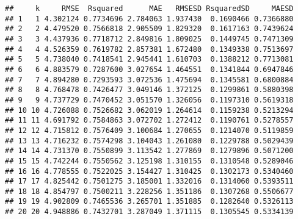 \documentclass[]{article}
\newenvironment{Shaded}{\begin{snugshade}}{\end{snugshade}}
\newcommand{\CommentTok}[1]{\textcolor[rgb]{0.56,0.35,0.01}{\textit{#1}}}
\newcommand{\DataTypeTok}[1]{\textcolor[rgb]{0.13,0.29,0.53}{#1}}
\newcommand{\DecValTok}[1]{\textcolor[rgb]{0.00,0.00,0.81}{#1}}
\newcommand{\KeywordTok}[1]{\textcolor[rgb]{0.13,0.29,0.53}{\textbf{#1}}}
\newcommand{\NormalTok}[1]{#1}
\newcommand{\OperatorTok}[1]{\textcolor[rgb]{0.81,0.36,0.00}{\textbf{#1}}}
\newcommand{\OtherTok}[1]{\textcolor[rgb]{0.56,0.35,0.01}{#1}}
\newcommand{\StringTok}[1]{\textcolor[rgb]{0.31,0.60,0.02}{#1}}
\begin{document}
\begin{Shaded}
\end{Shaded}

\begin{verbatim}
##     k     RMSE  Rsquared      MAE   RMSESD RsquaredSD     MAESD
## 1   1 4.302124 0.7734696 2.784063 1.937430  0.1690466 0.7366880
## 2   2 4.479520 0.7566818 2.905509 1.829320  0.1617163 0.7439624
## 3   3 4.437936 0.7718712 2.849816 1.809025  0.1449745 0.7471309
## 4   4 4.526359 0.7619782 2.857381 1.672480  0.1349338 0.7513697
## 5   5 4.738040 0.7418541 2.945441 1.610703  0.1388212 0.7713081
## 6   6 4.883579 0.7287600 3.027654 1.464551  0.1341844 0.6947846
## 7   7 4.894280 0.7293593 3.072536 1.475694  0.1345581 0.6800884
## 8   8 4.768478 0.7426477 3.049146 1.372125  0.1299861 0.5880398
## 9   9 4.737729 0.7470452 3.051570 1.326056  0.1197310 0.5619318
## 10 10 4.726088 0.7526682 3.062019 1.264614  0.1159238 0.5213294
## 11 11 4.691792 0.7584863 3.072702 1.272412  0.1190761 0.5278557
## 12 12 4.715812 0.7576409 3.100684 1.270655  0.1214070 0.5119859
## 13 13 4.716232 0.7574298 3.104043 1.261080  0.1229788 0.5029439
## 14 14 4.731370 0.7550899 3.113542 1.277869  0.1279896 0.5071200
## 15 15 4.742244 0.7550562 3.125198 1.310155  0.1310548 0.5289046
## 16 16 4.778555 0.7522025 3.154427 1.310425  0.1302173 0.5340460
## 17 17 4.825442 0.7501275 3.185001 1.332016  0.1314060 0.5393511
## 18 18 4.854797 0.7500211 3.228256 1.351186  0.1307268 0.5506677
## 19 19 4.902809 0.7465536 3.265701 1.351885  0.1282640 0.5326113
## 20 20 4.948886 0.7432701 3.287049 1.371115  0.1305545 0.5334139
\end{verbatim}
\end{document}
